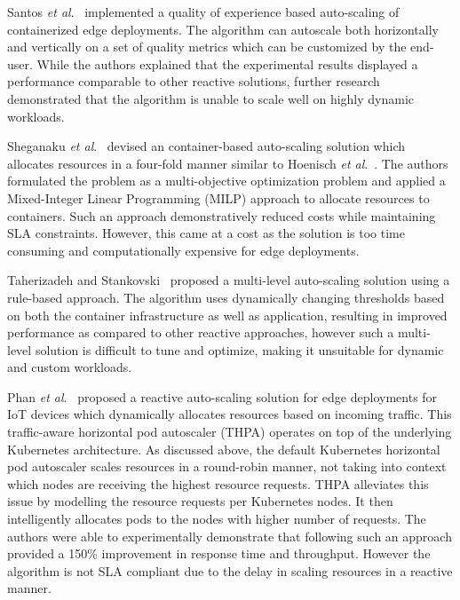 Santos \textit{et al}.~\cite{santos2020qoe} implemented a quality of experience based auto-scaling of containerized edge deployments. The algorithm can autoscale both horizontally and vertically on a set of quality metrics which can be customized by the end-user. While the authors explained that the experimental results displayed a performance comparable to other reactive solutions, further research demonstrated that the algorithm is unable to scale well on highly dynamic workloads.\par

Sheganaku \textit{et al}.~\cite{sheganaku2023cost} devised an container-based auto-scaling solution which allocates resources in a four-fold manner similar to Hoenisch \textit{et al}.~\cite{hoenisch2015four}. The authors formulated the problem as a multi-objective optimization problem and applied a Mixed-Integer Linear Programming (MILP) approach to allocate resources to containers. Such an approach demonstratively reduced costs while maintaining SLA constraints. However, this came at a cost as the solution is too time consuming and computationally expensive for edge deployments.\par

Taherizadeh and Stankovski~\cite{taherizadeh2019dynamic} proposed a multi-level auto-scaling solution using a rule-based approach. The algorithm uses dynamically changing thresholds based on both the container infrastructure as well as application, resulting in improved performance as compared to other reactive approaches, however such a multi-level solution is difficult to tune and optimize, making it unsuitable for dynamic and custom workloads.\par

Phan \textit{et al}.~\cite{phan2022traffic} proposed a reactive auto-scaling solution for edge deployments for IoT devices which dynamically allocates resources based on incoming traffic. This traffic-aware horizontal pod autoscaler (THPA) operates on top of the underlying Kubernetes architecture. As discussed above, the default Kubernetes horizontal pod autoscaler scales resources in a round-robin manner, not taking into context which nodes are receiving the highest resource requests. THPA alleviates this issue by modelling the resource requests per Kubernetes nodes. It then intelligently allocates pods to the nodes with higher number of requests. The authors were able to experimentally demonstrate that following such an approach provided a 150\% improvement in response time and throughput. However the algorithm is not SLA compliant due to the delay in scaling resources in a reactive manner.

